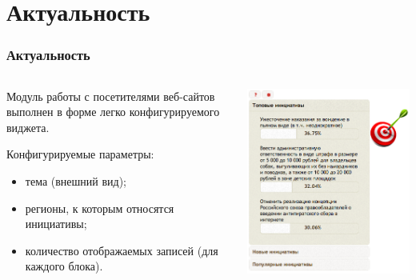 \section{Актуальность}

\begin{frame}
\frametitle{Актуальность}
\begin{columns}[T]
\begin{column}{0.55\textwidth}
Модуль работы с посетителями веб-сайтов выполнен в форме легко конфигурируемого виджета.

\vspace{0.5cm}
Конфигурируемые параметры:
\begin{itemize}
  \item тема (внешний вид);
  \item регионы, к которым относятся инициативы;
  \item количество отображаемых записей (для каждого блока).
\end{itemize}
\end{column}
\begin{column}{0.45\textwidth}
\vspace{0.5cm}
\includegraphics[width=1.0\textwidth]{images/widget}
\end{column}
\end{columns}
\end{frame}
